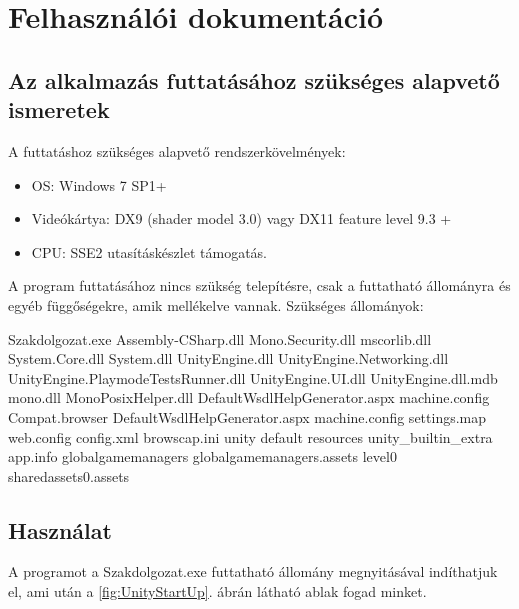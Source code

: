 \chapter*{Felhasználói dokumentáció}

\section*{Az alkalmazás futtatásához szükséges alapvető ismeretek}

A futtatáshoz szükséges alapvető rendszerkövelmények:
\begin{itemize}
\item OS: Windows 7 SP1+
\item Videókártya: DX9 (shader model 3.0) vagy DX11 feature level 9.3 +
\item CPU: SSE2 utasításkészlet  támogatás.
\end{itemize}

\noindent A program futtatásához nincs szükség telepítésre, csak a futtatható állományra és egyéb függőségekre, amik mellékelve vannak.
\newline
\newline Szükséges állományok:
\begin{cpp}
Szakdolgozat.exe Assembly-CSharp.dll Mono.Security.dll mscorlib.dll
System.Core.dll System.dll UnityEngine.dll UnityEngine.Networking.dll
UnityEngine.PlaymodeTestsRunner.dll UnityEngine.UI.dll
UnityEngine.dll.mdb mono.dll MonoPosixHelper.dll
DefaultWsdlHelpGenerator.aspx machine.config Compat.browser
DefaultWsdlHelpGenerator.aspx machine.config
settings.map web.config config.xml browscap.ini unity default
resources unity\_builtin\_extra app.info globalgamemanagers
globalgamemanagers.assets level0 sharedassets0.assets
\end{cpp}

\section*{Használat}
A programot a Szakdolgozat.exe futtatható állomány megnyitásával indíthatjuk el, ami után a \ref{fig:UnityStartUp}. ábrán látható ablak fogad minket.

